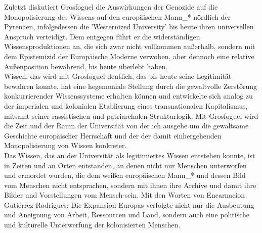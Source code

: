 \noindent Zuletzt diskutiert Grosfoguel die Auswirkungen der Genozide auf die
Monopolisierung des Wissens auf den europäischen Mann\_* nördlich der Pyrenäen,
infolgedessen die 'Westernized University' bis heute ihren universellen
Anspruch verteidigt. Dem entgegen führt er die widerständigen
Wissensproduktionen an, die sich zwar nicht vollkommen außerhalb, sondern mit
dem Epistemizid der Europäische Moderne verwoben, aber dennoch eine relative
Außenposition bewahrend, bis heute überlebt haben.\footnotemark {}\\

\noindent Wissen, das wird mit Grosfoguel deutlich, das bis heute seine Legitimität
bewahren konnte, hat eine hegemoniale Stellung durch die gewaltvolle Zerstörung
konkurrierender Wissenssysteme erhalten können und entwickelte sich analog zu
der imperialen und kolonialen Etablierung eines transnationalen Kapitalismus,
mitsamt seiner rassistischen und patriarchalen Strukturlogik. 
Mit Grosfoguel wird die Zeit und der Raum der Universität von der ich ausgehe um die
gewaltsame Geschichte europäischer Herrschaft und der der damit einhergehenden
Monopolisierung von Wissen konkreter.\\

\noindent Das Wissen, das an der Universität als legitimiertes Wissen entstehen konnte,
ist in Zeiten und an Orten entstanden, an denen nicht nur Menschen unterworfen
und ermordet wurden, die dem weißen europäischen Mann\_* und dessen Bild vom
Menschen nicht entsprachen, sondern mit ihnen ihre Archive und damit ihre
Bilder und Vorstellungen vom Mensch-sein. Mit den Worten von Encarnacíon
Gutiérrez Rodrigues: \glqq Die Expansion Europas verfolgte nicht nur die Ausbeutung
und Aneignung von Arbeit, Ressourcen und Land, sondern auch eine politische und
kulturelle Unterwerfung der kolonisierten Menschen. \grqq \footnotemark
{}
